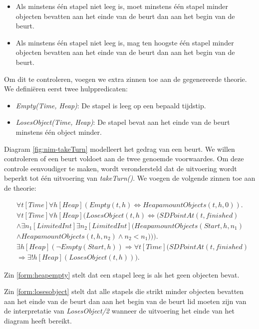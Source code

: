 \begin{itemize}
	\item Als minstens \'e\'en stapel niet leeg is, moet minstens \'e\'en stapel minder objecten bevatten aan het einde van de beurt dan aan het begin van de beurt.
	\item Als minstens \'e\'en stapel niet leeg is, mag ten hoogste \'e\'en stapel minder objecten bevatten aan het einde van de beurt dan aan het begin van de beurt.
\end{itemize}

Om dit te controleren, voegen we extra zinnen toe aan de gegenereerde theorie. We defini\"eren eerst twee hulppredicaten:

\begin{itemize}
	\item \textit{Empty(Time, Heap)}: De stapel is leeg op een bepaald tijdstip.
	\item \textit{LosesObject(Time, Heap)}: De stapel bevat aan het einde van de beurt minstens \'e\'en object minder.
\end{itemize}

Diagram \ref{fig:nim-takeTurn} modelleert het gedrag van een beurt. We willen controleren of een beurt voldoet aan de twee genoemde voorwaardes. Om deze controle eenvoudiger te maken, wordt verondersteld dat de uitvoering wordt beperkt tot \'e\'en uitvoering van \textit{takeTurn()}.
We voegen de volgende zinnen toe aan de theorie:

\begin{align}
	&\forall{t}[Time]\forall{h}[Heap](Empty(t, h) \Leftrightarrow HeapamountObjects(t, h, 0)).\label{form:heapempty} \\
	&\nonumber \forall{t}[Time]\forall{h}[Heap](LosesObject(t, h) \Leftrightarrow (SDPointAt(t, finished) \\ &\nonumber \land \exists{n_1}[LimitedInt]\exists{n_2}[LimitedInt](HeapamountObjects(Start, h, n_1) \\ &\land HeapamountObjects(t, h, n_2) \land n_2 < n_1))).\label{form:losesobject} \\
	&\nonumber \exists{h}[Heap](\lnot{}Empty(Start, h)) \Rightarrow \forall{t}[Time](SDPointAt(t, finished) \\ &\Rightarrow \exists!{h}[Heap](LosesObject(t, h)))\label{form:turncondition}.
\end{align}

Zin \ref{form:heapempty} stelt dat een stapel leeg is als het geen objecten bevat.

Zin \ref{form:losesobject} stelt dat alle stapels die strikt minder objecten bevatten aan het einde van de beurt dan aan het begin van de beurt lid moeten zijn van de interpretatie van \textit{LosesObject/2} wanneer de uitvoering het einde van het diagram heeft bereikt.

